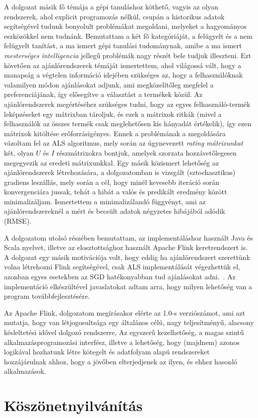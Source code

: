 \documentclass[a4paper,12pt]{article}
\begin{document}
A dolgozat másik fő témája a gépi tanuláshoz köthető, vagyis az olyan rendszerek, ahol explicit programozás nélkül, csupán a historikus adatok segítségével tudunk bonyolult problémákat megoldani, melyeket a hagyományos eszközökkel nem tudnánk. Bemutattam a két fő kategóriáját, a felügyelt és a nem felügyelt tanítást, a ma ismert gépi tanulási tudománynak, amibe a ma ismert \textsl{mesterséges intelligencia} jellegű problémák nagy részét bele tudjuk illeszteni.  Ezt követően az ajánlórendszerek témáját ismertettem, ahol világossá vált, hogy a manapság a végtelen információ idejében szükséges az, hogy a felhasználóknak valamilyen módon ajánlásokat adjunk, ami megközelítőleg megfelel a preferenciájának, így elősegítve a választást a termékek közül. Az ajánlórendszerek megértéséhez szükséges tudni, hogy az egyes felhasználó-termék leképzéseket egy mátrixban tároljuk, és ezek a mátrixok ritkák (mivel a felhasználók az összes termék csak meglehetősen kis hányadát értékelik), így ezen mátrixok kitöltése erőforrásigényes.
\newline
Ennek a problémának a megoldására vázoltam fel az ALS algoritmus, mely során az úgynevezett \textsl{rating mátrixunkat} két, olyan $U$ és $I$ részmátrixokra bontjuk, amelyek szorzata hozzávetőlegesen megegyezik az eredeti 
mátrixunkkal. 
Egy másik közismert lehetőség az ajánlórendszerek létrehozására, a dolgozatomban is vizsgált (sztochasztikus) gradiens leszállás, mely során a cél, hogy minél kevesebb iteráció során konvergenciára jussak, tehát a hibát a valós és predikált eredmény között minimalizáljam. Ismertettem a minimalizálandó függvényt, ami az ajánlórendszereknél a mért és becsült adatok négyzetes hibájából adódik (RMSE).  
\newline

A dolgozatom utolsó részében bemutattam, az implementáláshoz használt Java és Scala nyelvet, illetve az elosztottsághoz használt Apache Flink keretrendszert is. A dolgozat egy másik motivációja volt, hogy eddig ha ajánlórendszert szerettünk volna létrehozni Flink segítségével, csak ALS implementálását végezhettük el, azonban egyes esetekben az SGD hatékonyabban tud ajánlásokat adni.~\parencite{alsgd}. Az implementáció elkészültével javaslatokat adtam arra, hogy milyen lehetőség van a program továbbfejlesztésére.
\newline

Az Apache Flink, dolgozatom megírásakor elérte az 1.0-s verziószámot, ami azt mutatja, hogy van létjogosultsága egy általános célú, nagy teljesítményű, alacsony késleltetési idővel dolgozó rendszerre, Az egyszerű kezelhetőség, a magas szintű alkalmazásprogramozási interfész, illetve a lehetőség, hogy (majdnem) azonos logikával hozhatunk létre kötegelt és adatfolyam alapú rendszereket hozzájárulnak ahhoz, hogy a jövőben elterjedjenek az ilyen, és ehhez hasonló alkalmazások.

\newpage
\section{Köszönetnyilvánítás}	

\newpage

\printbibliography
\listoffigures
\end{document}
